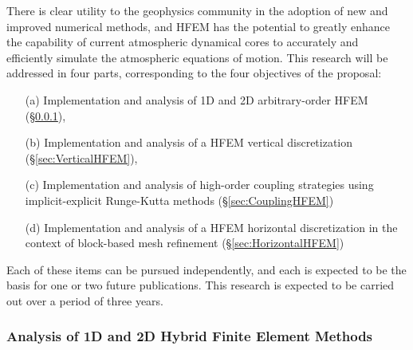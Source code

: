 \documentclass[11pt]{article}
\begin{document}
There is clear utility to the geophysics community in the adoption of new and improved numerical methods, and HFEM has the potential to greatly enhance the capability of current atmospheric dynamical cores to accurately and efficiently simulate the atmospheric equations of motion.  This research will be addressed in four parts, corresponding to the four objectives of the proposal:
\begin{itemize}
\item[(a)] Implementation and analysis of 1D and 2D arbitrary-order HFEM (\S \ref{sec:AnalysisHFEM}),
\item[(b)] Implementation and analysis of a HFEM vertical discretization (\S \ref{sec:VerticalHFEM}),
\item[(c)] Implementation and analysis of high-order coupling strategies using implicit-explicit Runge-Kutta methods (\S \ref{sec:CouplingHFEM})
\item[(d)] Implementation and analysis of a HFEM horizontal discretization in the context of block-based mesh refinement (\S \ref{sec:HorizontalHFEM})
\end{itemize}  Each of these items can be pursued independently, and each is expected to be the basis for one or two future publications.  This research is expected to be carried out over a period of three years.

\subsubsection{Analysis of 1D and 2D Hybrid Finite Element Methods} \label{sec:AnalysisHFEM}
\end{document}
